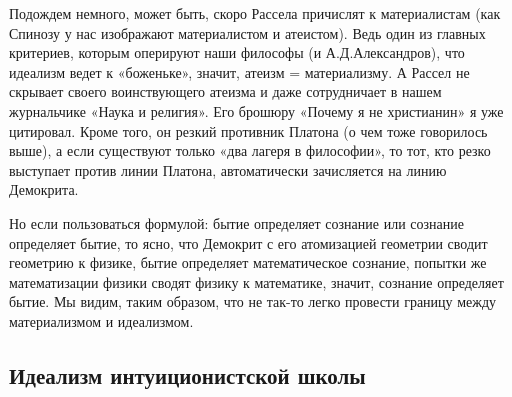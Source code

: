Подождем немного, может быть, скоро Рассела причислят к материалистам
(как Спинозу у нас изображают материалистом и атеистом). Ведь один из
главных критериев, которым оперируют наши философы (и
А.Д.Александров), что идеализм ведет к «боженьке», значит, атеизм =
материализму. А Рассел не скрывает своего воинствующего атеизма и даже
сотрудничает в нашем журнальчике «Наука и религия». Его брошюру
«Почему я не христианин» я уже цитировал. Кроме того, он резкий
противник Платона (о чем тоже говорилось выше), а если существуют
только «два лагеря в философии», то тот, кто резко выступает против
линии Платона, автоматически зачисляется на линию Демокрита.

Но если пользоваться формулой: бытие определяет сознание или сознание
определяет бытие, то ясно, что Демокрит с его атомизацией геометрии
сводит геометрию к физике, бытие определяет математическое сознание,
попытки же математизации физики сводят физику к математике, значит,
сознание определяет бытие. Мы видим, таким образом, что не так-то
легко провести границу между материализмом и идеализмом.

\subsection{Идеализм интуиционистской школы}

